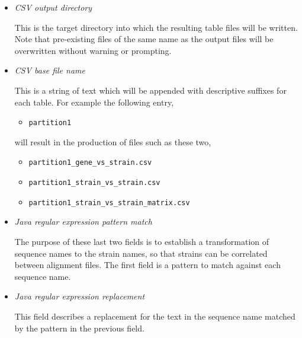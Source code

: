\documentclass[12pt,letterpaper]{article}
\begin{document}
\begin{itemize}
\item \textit{CSV output directory} \hfill \\
    This is the target directory into which the resulting table files will be
    written.  Note that pre-existing files of the same name as the output files
    will be overwritten without warning or prompting.

\item \textit{CSV base file name} \hfill \\
    This is a string of text which will be appended with descriptive suffixes
    for each table.  For example the following entry,
    
    \begin{itemize}
    \item[]\texttt{partition1}
    \end{itemize}

    will result in the production of files such as these two,

    \begin{itemize}
    \item[]\texttt{partition1\_gene\_vs\_strain.csv}
    \item[]\texttt{partition1\_strain\_vs\_strain.csv}
    \item[]\texttt{partition1\_strain\_vs\_strain\_matrix.csv}
    \end{itemize}

\item \textit{Java regular expression pattern match} \hfill \\
    The purpose of these last two fields is to establish a transformation of
    sequence names to the strain names, so that strains can be correlated
    between alignment files.  The first field is a pattern to match against
    each sequence name.

\item \textit{Java regular expression replacement} \hfill \\
    This field describes a replacement for the text in the sequence name
    matched by the pattern in the previous field.

\end{itemize}
\end{document}
